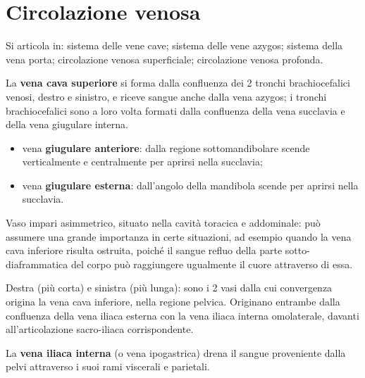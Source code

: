 \section{Circolazione venosa}

Si articola in: sistema delle vene cave; sistema delle vene azygos; sistema della vena porta;
circolazione venosa superficiale; circolazione venosa profonda.

La \textbf{vena cava superiore} si forma dalla confluenza dei 2 tronchi brachiocefalici venosi,
destro e sinistro, e riceve sangue anche dalla vena azygos; i tronchi brachiocefalici sono a loro
volta formati dalla confluenza della vena succlavia e della vena giugulare interna.

\begin{itemize}
  \item vena \textbf{giugulare anteriore}: dalla regione sottomandibolare scende verticalmente e
    centralmente per aprirsi nella succlavia;
  \item vena \textbf{giugulare esterna}: dall'angolo della mandibola scende per aprirsi nella
    succlavia.
\end{itemize}

Vaso impari asimmetrico, situato nella cavità toracica e addominale: può assumere una grande
importanza in certe situazioni, ad esempio quando la vena cava inferiore risulta ostruita, poiché
il sangue refluo della parte sotto-diaframmatica del corpo può raggiungere ugualmente il cuore
attraverso di essa.

Destra (più corta) e sinistra (più lunga): sono i 2 vasi dalla cui convergenza origina la vena
cava inferiore, nella regione pelvica. Originano entrambe dalla confluenza della vena iliaca
esterna con la vena iliaca interna omolaterale, davanti all'articolazione sacro-iliaca
corrispondente.

La \textbf{vena iliaca interna} (o vena ipogastrica) drena il sangue proveniente dalla pelvi
attraverso i suoi rami viscerali e parietali.
